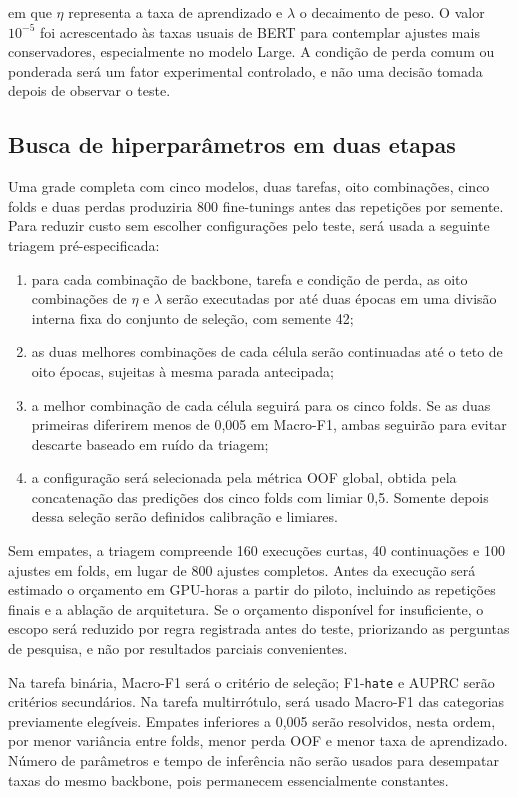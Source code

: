 em que $\eta$ representa a taxa de aprendizado e $\lambda$ o decaimento de
peso. O valor $10^{-5}$ foi acrescentado às taxas usuais de BERT para contemplar
ajustes mais conservadores, especialmente no modelo Large. A condição de perda
comum ou ponderada será um fator experimental controlado, e não uma decisão
tomada depois de observar o teste.

\subsection{Busca de hiperparâmetros em duas etapas}

Uma grade completa com cinco modelos, duas tarefas, oito combinações, cinco
folds e duas perdas produziria 800 fine-tunings antes das repetições por semente.
Para reduzir custo sem escolher configurações pelo teste, será usada a seguinte
triagem pré-especificada:

\begin{enumerate}
    \item para cada combinação de backbone, tarefa e condição de perda, as oito
    combinações de $\eta$ e $\lambda$ serão executadas por até duas épocas em uma
    divisão interna fixa do conjunto de seleção, com semente 42;
    \item as duas melhores combinações de cada célula serão continuadas até o
    teto de oito épocas, sujeitas à mesma parada antecipada;
    \item a melhor combinação de cada célula seguirá para os cinco folds. Se as
    duas primeiras diferirem menos de 0,005 em Macro-F1, ambas seguirão para
    evitar descarte baseado em ruído da triagem;
    \item a configuração será selecionada pela métrica OOF global, obtida pela
    concatenação das predições dos cinco folds com limiar 0,5. Somente depois
    dessa seleção serão definidos calibração e limiares.
\end{enumerate}

Sem empates, a triagem compreende 160 execuções curtas, 40 continuações e 100
ajustes em folds, em lugar de 800 ajustes completos. Antes da execução será
estimado o orçamento em GPU-horas a partir do piloto, incluindo as repetições
finais e a ablação de arquitetura. Se o orçamento disponível for insuficiente,
o escopo será reduzido por regra registrada antes do teste, priorizando as
perguntas de pesquisa, e não por resultados parciais convenientes.

Na tarefa binária, Macro-F1 será o critério de seleção; F1-\texttt{hate} e AUPRC
serão critérios secundários. Na tarefa multirrótulo, será usado Macro-F1 das
categorias previamente elegíveis. Empates inferiores a 0,005 serão resolvidos,
nesta ordem, por menor variância entre folds, menor perda OOF e menor taxa de
aprendizado. Número de parâmetros e tempo de inferência não serão usados para
desempatar taxas do mesmo backbone, pois permanecem essencialmente constantes.

